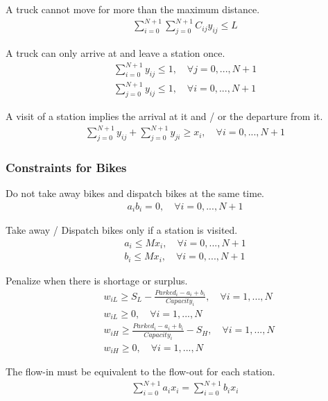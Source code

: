 \documentclass[a4paper, 12pt]{article}%
\theoremstyle{definition}
\begin{document}
\noindent A truck cannot move for more than the maximum distance.
\begin{align}
    \quad  \sum_{i = 0}^{N+1} \sum_{j = 0}^{N+1} C_{ij} y_{ij} \leq L
\end{align}

\noindent A truck can only arrive at and leave a station once.
\begin{align}
    \quad  \sum_{i = 0}^{N+1} y_{ij} \leq 1, \quad  \forall j = 0,...,N+1 \\
    \quad \sum_{j = 0}^{N+1} y_{ij} \leq 1, \quad  \forall i = 0,...,N+1
\end{align}

\noindent A visit of a station implies the arrival at it and / or the departure from it.
\begin{align}
    \quad  \sum_{j = 0}^{N+1} y_{ij} + \sum_{j = 0}^{N+1} y_{ji} \geq x_i, \quad  \forall i = 0,...,N+1
\end{align}

\subsubsection{Constraints for Bikes}
\noindent Do not take away bikes and dispatch bikes at the same time.
\begin{align}
    \quad  a_i b_i = 0, \quad  \forall i = 0,...,N+1
\end{align}

\noindent Take away / Dispatch bikes only if a station is visited.
\begin{align}
    \quad  a_i \leq M x_i, \quad  \forall i = 0,...,N+1 \\
    \quad  b_i \leq M x_i, \quad \forall i = 0,...,N+1
\end{align}

\noindent Penalize when there is shortage or surplus. 
\begin{align}
    \quad  & w_{iL} \geq S_L - \frac{Parked_i - a_i + b_i}{Capacity_i}, \quad  \forall i = 1,...,N \\
    \quad  & w_{iL} \geq 0, \quad  \forall i = 1,...,N \\
    \quad  & w_{iH} \geq \frac{Parked_i - a_i + b_i}{Capacity_i} - S_H, \quad  \forall i = 1,...,N \\
    \quad  & w_{iH} \geq 0, \quad  \forall i = 1,...,N
\end{align}

\noindent The flow-in must be equivalent to the flow-out for each station. 
\begin{align}
    \quad  \sum_{i = 0}^{N+1} a_i x_i = \sum_{i = 0}^{N+1} b_i x_i
\end{align}
\end{document}
